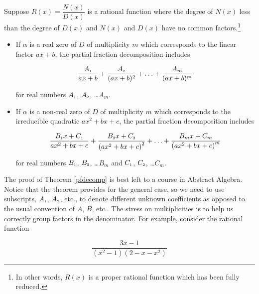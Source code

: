 \documentclass{ximera}
\begin{document}
\colorbox{ResultColor}{\bbm

\begin{theorem}  \label{pfdecomp} Suppose $R(x) = \dfrac{N(x)}{D(x)}$ is a rational function where the degree of $N(x)$ less than the degree of $D(x)$ and $N(x)$ and $D(x)$ have no common factors.\footnote{In other words, $R(x)$ is a proper rational function which has been fully reduced.}

\begin{itemize}

\item  If $\alpha$ is a real zero of $D$ of multiplicity $m$ which corresponds to the linear factor $ax+b$, the partial fraction decomposition includes

\[ \dfrac{A_{\mbox{\tiny$1$}}}{ax+b} + \dfrac{A_{\mbox{\tiny$2$}}}{(ax+b)^2} + \ldots + \dfrac{A_{m}}{(ax+b)^m} \]

for real numbers $A_{\mbox{\tiny$1$}}$, $A_{\mbox{\tiny$2$}}$, \ldots $A_{m}$.

\item  If $\alpha$ is a non-real zero of $D$ of multiplicity $m$ which corresponds to the irreducible quadratic $ax^2+bx+c$, the partial fraction decomposition includes  

\[ \dfrac{B_{\mbox{\tiny$1$}}x + C_{\mbox{\tiny$1$}}}{ax^2+bx+c} + \dfrac{B_{\mbox{\tiny$2$}}x + C_{\mbox{\tiny$2$}}}{\left(ax^2+bx+c\right)^2} + \ldots +\dfrac{B_{m}x + C_{m}}{\left(ax^2+bx+c\right)^m} \]

for real numbers $B_{\mbox{\tiny$1$}}$, $B_{\mbox{\tiny$2$}}$, \ldots $B_{m}$ and $C_{\mbox{\tiny$1$}}$, $C_{\mbox{\tiny$2$}}$, \ldots $C_{m}$. 

\end{itemize}


\end{theorem}

\ebm}


\smallskip

The proof of Theorem \ref{pfdecomp} is best left to a course in Abstract Algebra.  Notice that the theorem provides for the general case, so we need to use subscripts, $A_{\mbox{\tiny$1$}}$, $A_{\mbox{\tiny$2$}}$, etc.,  to denote different unknown coefficients as opposed to the usual convention of $A$, $B$, etc..  The stress on multiplicities is to help us correctly group factors in the denominator.  For example, consider the rational function

\[\dfrac{3x-1}{\left(x^2-1\right)\left(2-x-x^2\right)}\]
\end{document}
